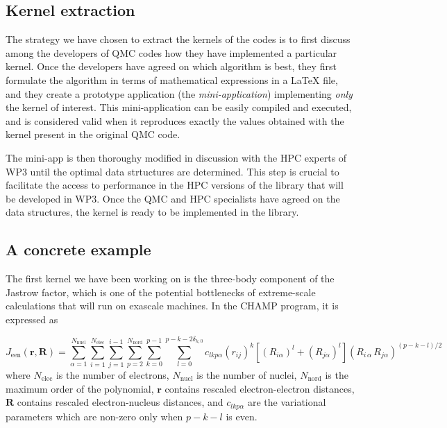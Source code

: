 \subsection{Kernel extraction}

The strategy we have chosen to extract the kernels of the codes is to
first discuss among the developers of \ac{QMC} codes how they have
implemented a particular kernel. Once the developers have agreed on
which algorithm is best, they first formulate the algorithm in terms
of mathematical expressions in a {\LaTeX} file, and they create a prototype application 
(the \emph{mini-application}) implementing \emph{only} the kernel of
interest. This mini-application can be easily compiled and executed,
and is considered valid when it reproduces exactly the values obtained
with the kernel present in the original \ac{QMC} code.

The mini-app is then thoroughy modified in discussion with the
\ac{HPC} experts of \ac{WP}3 until the optimal data strtuctures are
determined. This step is crucial to facilitate the access to performance
in the \ac{HPC} versions of the library that will be developed in \ac{WP}3.
Once the \ac{QMC} and \ac{HPC} specialists have agreed
on the data structures, the kernel is ready to be implemented in the
library.


\subsection{A concrete example}

The first kernel we have been working on is the three-body component of
the Jastrow factor, which is one of the potential bottlenecks of
extreme-scale calculations that will run on exascale machines.
In the CHAMP program, it is expressed as

\newcommand{\Jeen}{J_{\text{een}}}
\newcommand{\Nel}{N_{\text{elec}}}
\newcommand{\Nat}{N_{\text{nucl}}}
\newcommand{\Nord}{N_{\text{nord}}}
\newcommand{\lmax}{p-k-2\delta_{k,0}}
\newcommand{\br}{\mathbf{r}}
\newcommand{\bR}{\mathbf{R}}
\[
  \Jeen (\br,\bR) = \sum_{\alpha=1}^{\Nat} \sum_{i=1}^{\Nel} \sum_{j=1}^{i-1}
\sum_{p=2}^{\Nord} \sum_{k=0}^{p-1}
\sum_{l=0}^{\lmax} c_{lkp\alpha}
\left( {r}_{ij} \right)^k
\left[ \left( {R}_{i\alpha} \right)^l + \left( {R}_{j\alpha} \right)^l \right]
\left( {R}_{i\,\alpha} \, {R}_{j\alpha} \right)^{(p-k-l)/2} 
\]
where
$\Nel$ is the number of electrons, 
$\Nat$ is the number of nuclei,
$\Nord$ is the maximum order of the polynomial, 
$\br$ contains rescaled electron-electron distances, 
$\bR$ contains rescaled electron-nucleus distances,
and $c_{lkp\alpha}$ are the variational parameters which are non-zero
only when $p-k-l$ is even.

